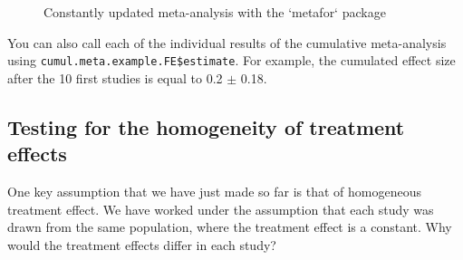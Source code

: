 \documentclass[]{book}
\theoremstyle{definition}
\theoremstyle{definition}
\theoremstyle{definition}
\theoremstyle{remark}
\begin{document}
\begin{figure}[htbp]

{\centering {}

}

\caption{Constantly updated meta-analysis with the `metafor` package}\label{fig:cumWMAEmetafor}
\end{figure}

You can also call each of the individual results of the cumulative
meta-analysis using \texttt{cumul.meta.example.FE\$estimate}. For
example, the cumulated effect size after the 10 first studies is equal
to 0.2 \(\pm\) 0.18.

\subsection{Testing for the homogeneity of treatment
effects}\label{testing-for-the-homogeneity-of-treatment-effects}

One key assumption that we have just made so far is that of homogeneous
treatment effect. We have worked under the assumption that each study
was drawn from the same population, where the treatment effect is a
constant. Why would the treatment effects differ in each study?
\end{document}
